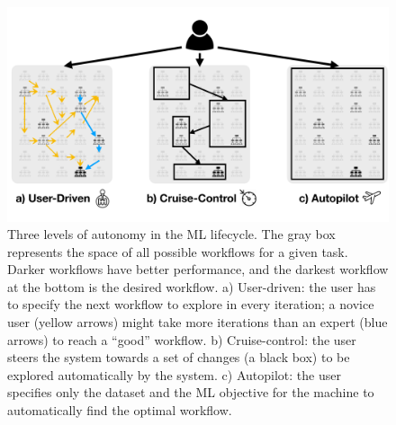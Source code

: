 \documentclass[11pt,dvipdfmx]{article}
\begin{document}
\begin{figure}
    \centering
    \vspace{-10pt}    \includegraphics[width=\linewidth]{figs/ml-ieee-bulletin-fig.pdf}
    \vspace{-25pt}
    \caption{Three levels of autonomy in the ML lifecycle.
    The gray box represents the space of all possible workflows for a given task. 
    Darker workflows have better performance, and the darkest workflow at the bottom is the desired workflow.
    a) User-driven: the user has to specify the next workflow to explore in every iteration;
    a novice user (yellow arrows) might take more iterations than an expert (blue arrows)
    to reach a ``good'' workflow.
    b) Cruise-control: the user steers the system towards a set of changes (a black box) 
    to be explored automatically by the system.
    c) Autopilot: the user specifies only the dataset and the ML objective for the machine to automatically find the optimal workflow.
    }
    \label{fig:autonomy}
\vspace{-10pt}
\end{figure}
\end{document}
